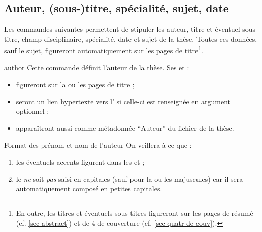 \subsection{Auteur, (sous-)titre, spécialité, sujet,
  date}\label{sec-caracteristiques}

Les commandes suivantes permettent de stipuler les auteur, titre et éventuel
sous-titre, champ disciplinaire, spécialité, date et sujet de la thèse. Toutes
ces données, sauf le sujet, figureront automatiquement sur les pages de
titre\footnote{En outre, les titres et éventuels sous-titres figureront sur les
  pages de résumé (cf. \vref{sec-abstract}) et de 4\ieme{} de couverture (cf.
  \vref{sec-quatr-de-couv}).}.
%
\begin{docCommand}[doc description=\mandatory]{author}{}%
  Cette commande définit l'auteur de la thèse. Ses  et
   :
  \begin{itemize}
  \item figureront sur la ou les pages de titre ;
  \item%
    seront un lien hypertexte vers l' si celle-ci est
    renseignée en argument optionnel ;
  \item apparaîtront aussi comme métadonnée \enquote{Auteur} du
    fichier \pdf{} de la thèse.
  \end{itemize}
  \begin{dbwarning}{Format des prénom et nom de l'auteur}{}
    On veillera à ce que :
    \begin{enumerate}
    \item les éventuels accents figurent dans les  et
      ;
    \item {}%
      le  \emph{ne} soit \emph{pas} saisi en capitales (sauf pour la
      ou les majuscules) car il sera automatiquement composé en petites
      capitales.
    \end{enumerate}
  \end{dbwarning}
\end{docCommand}
